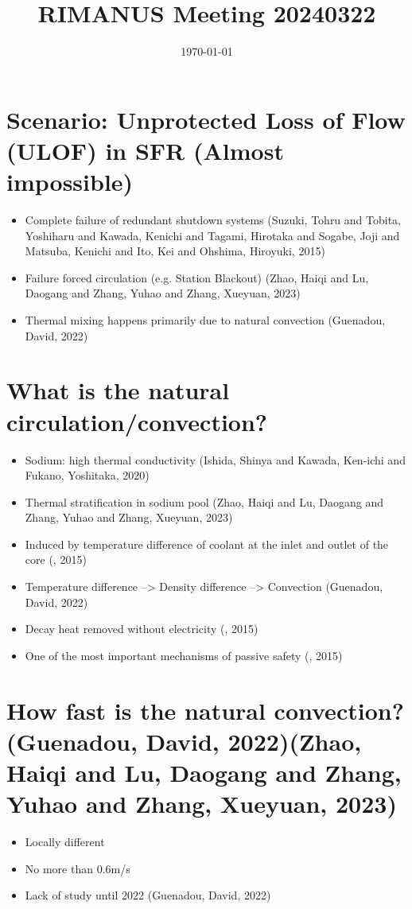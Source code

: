 \documentclass[11pt]{article}
\date{\today}
\title{RIMANUS Meeting 20240322}
\begin{document}
\maketitle

\section{Scenario: Unprotected Loss of Flow (ULOF) in SFR (Almost impossible)}
\label{sec:org555f727}
\begin{itemize}
\item Complete failure of redundant shutdown systems (Suzuki, Tohru and Tobita, Yoshiharu and Kawada, Kenichi and Tagami, Hirotaka and Sogabe, Joji and Matsuba, Kenichi and Ito, Kei and Ohshima, Hiroyuki, 2015)
\item Failure forced circulation (e.g. Station Blackout) (Zhao, Haiqi and Lu, Daogang and Zhang, Yuhao and Zhang, Xueyuan, 2023)
\item Thermal mixing happens primarily due to natural convection (Guenadou, David, 2022)
\end{itemize}
\cite{ZusatzversorgungOeffentlichenDienstes}

\cite{zuoTwodimensionalNumericalSimulation2013}
\section{What is the natural circulation/convection?}
\label{sec:org9011da3}
\begin{itemize}
\item Sodium: high thermal conductivity (Ishida, Shinya and Kawada, Ken-ichi and Fukano, Yoshitaka, 2020)
\item Thermal stratification in sodium pool (Zhao, Haiqi and Lu, Daogang and Zhang, Yuhao and Zhang, Xueyuan, 2023)
\item Induced by temperature difference of coolant at the inlet and outlet of the core (, 2015)
\item Temperature difference --> Density difference --> Convection (Guenadou, David, 2022)
\item Decay heat removed without electricity (, 2015)
\item One of the most important mechanisms of passive safety (, 2015)
\end{itemize}

\section{How fast is the natural convection? (Guenadou, David, 2022)(Zhao, Haiqi and Lu, Daogang and Zhang, Yuhao and Zhang, Xueyuan, 2023)}
\label{sec:org591c077}
\begin{itemize}
\item Locally different
\item No more than 0.6m/s
\item Lack of study until 2022 (Guenadou, David, 2022)
\end{itemize}
\end{document}
